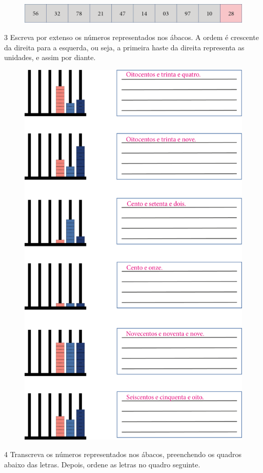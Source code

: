 \begin{figure}[htpb!]
\includegraphics[width=\textwidth]{./media/image4.png}
\end{figure}

\pagebreak
\num{3} Escreva por extenso os números representados nos ábacos. A ordem
é crescente da direita para a esquerda, ou seja, a primeira haste da
direita representa as unidades, e assim por diante.

\begin{figure}[htpb!]
\includegraphics[width=.7\textwidth]{./media/image5.png}
\end{figure}

\pagebreak
\num{4} Transcreva os números representados nos ábacos, preenchendo os
quadros abaixo das letras. Depois, ordene as letras no quadro seguinte.

